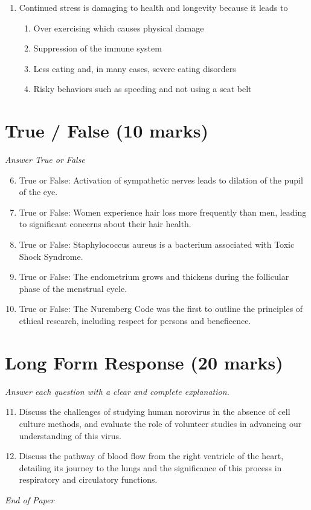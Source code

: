 \documentclass[12pt]{article}
\begin{document}
\begin{enumerate}[label=\arabic*.]
\begin{enumerate}[label=(\alph*)]
    \item Linda George and Stephen Weiler
    \item William Masters and Virginia Johnson
\end{enumerate}
\item Continued stress is damaging to health and longevity because it leads to
\begin{enumerate}[label=(\alph*)]
    \item Over exercising which causes physical damage
    \item Suppression of the immune system
    \item Less eating and, in many cases, severe eating disorders
    \item Risky behaviors such as speeding and not using a seat belt
\end{enumerate}
\end{enumerate}

\section*{True / False (10 marks)}
\textit{Answer True or False}
\begin{enumerate}[label=\arabic*.]
\setcounter{enumi}{5}
\item True or False: Activation of sympathetic nerves leads to dilation of the pupil of the eye.
\item True or False: Women experience hair loss more frequently than men, leading to significant concerns about their hair health.
\item True or False: Staphylococcus aureus is a bacterium associated with Toxic Shock Syndrome.
\item True or False: The endometrium grows and thickens during the follicular phase of the menstrual cycle.
\item True or False: The Nuremberg Code was the first to outline the principles of ethical research, including respect for persons and beneficence.
\end{enumerate}

\section*{Long Form Response (20 marks)}
\textit{Answer each question with a clear and complete explanation.}
\begin{enumerate}[label=\arabic*.]
\setcounter{enumi}{10}
\item Discuss the challenges of studying human norovirus in the absence of cell culture methods, and evaluate the role of volunteer studies in advancing our understanding of this virus.
\item Discuss the pathway of blood flow from the right ventricle of the heart, detailing its journey to the lungs and the significance of this process in respiratory and circulatory functions.
\end{enumerate}

\vfill
\noindent\textit{End of Paper}
\end{document}
